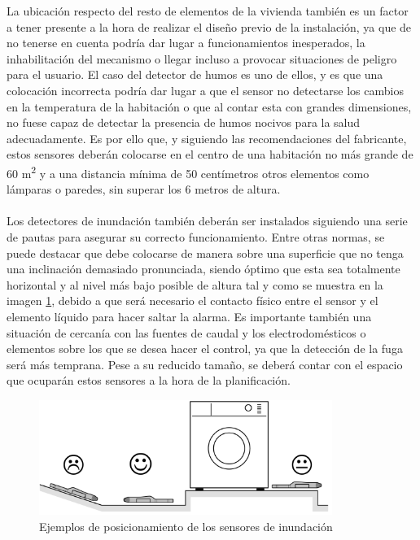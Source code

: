 La ubicación respecto del resto de elementos de la vivienda también es un factor a tener presente a la hora de realizar el diseño previo de la instalación, ya que de no tenerse en cuenta podría dar lugar a funcionamientos inesperados, la inhabilitación del mecanismo o llegar incluso a provocar situaciones de peligro para el usuario. El caso del detector de humos es uno de ellos, y es que una colocación incorrecta podría dar lugar a que el sensor no detectarse los cambios en la temperatura de la habitación o que al contar esta con grandes dimensiones, no fuese capaz de detectar la presencia de humos nocivos para la salud adecuadamente. Es por ello que, y siguiendo las recomendaciones del fabricante, estos sensores deberán colocarse en el centro de una habitación no más grande de 60 m\textsuperscript{2} y a una distancia mínima de 50 centímetros  otros elementos como lámparas o paredes, sin superar los 6 metros de altura. \\\\
Los detectores de inundación también deberán ser instalados siguiendo una serie de pautas para asegurar su correcto funcionamiento. Entre otras normas, se puede destacar que debe colocarse de manera sobre una superficie que no tenga una inclinación demasiado pronunciada, siendo óptimo que esta sea totalmente horizontal y al nivel más bajo posible de altura tal y como se muestra en la imagen \ref{fig:local_inundacion}, debido a que será necesario el contacto físico entre el sensor y el elemento líquido para hacer saltar la alarma. Es importante también una situación de cercanía con las fuentes de caudal y los electrodomésticos o elementos sobre los que se desea hacer el control, ya que la detección de la fuga será más temprana. Pese a su reducido tamaño, se deberá contar con el espacio que ocuparán estos sensores a la hora de la planificación.
\begin{figure}[H]
\begin{center}
\includegraphics[width=0.85\textwidth]{figures/local_inundacion.png}   
\caption{Ejemplos de posicionamiento de los sensores de inundación}
\label{fig:local_inundacion}
\end{center}
\end{figure}
